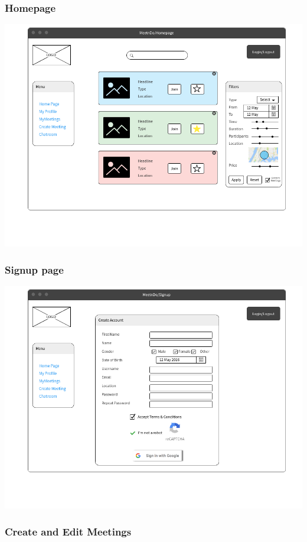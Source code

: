 \documentclass[conference]{IEEEtran}
\begin{document}
\subsubsection{Homepage} \hspace{10cm}

\includegraphics[scale=0.3]{mockups/Homepage}

\subsubsection{Signup page} \hspace{10cm}

\includegraphics[scale=0.3]{mockups/Signup}

\subsubsection{Create and Edit Meetings} \hspace{10cm}
\end{document}

